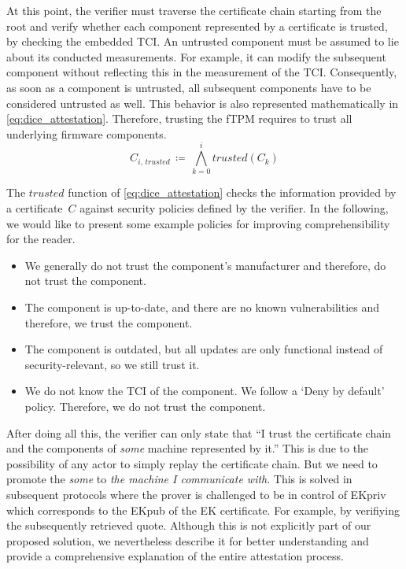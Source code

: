 At this point, the verifier must traverse the certificate chain starting from the root and verify whether each component represented by a certificate is trusted, by checking the embedded TCI\@.
An untrusted component must be assumed to lie about its conducted measurements.
For example, it can modify the subsequent component without reflecting this in the measurement of the TCI\@.
Consequently, as soon as a component is untrusted, all subsequent components have to be considered untrusted as well.
This behavior is also represented mathematically in \autoref{eq:dice_attestation}.
Therefore, trusting the fTPM requires to trust all underlying firmware components.
\begin{equation}
    \label{eq:dice_attestation}
    C_{i, \, trusted} \, \coloneqq \, \bigwedge_{k=0}^{i} trusted(C_{k})
\end{equation}


The \(trusted\) function of \autoref{eq:dice_attestation} checks the information provided by a certificate~\(C\) against security policies defined by the verifier.
In the following, we would like to present some example policies for improving comprehensibility for the reader.

\begin{itemize}
    \item We generally do not trust the component's manufacturer and therefore, do not trust the component.
    \item The component is up-to-date, and there are no known vulnerabilities and therefore, we trust the component.
    \item The component is outdated, but all updates are only functional instead of security-relevant, so we still trust it.
    \item We do not know the TCI of the component. We follow a `Deny by default' policy. Therefore, we do not trust the component.
\end{itemize}

After doing all this, the verifier can only state that ``I trust the certificate chain and the components of \emph{some} machine represented by it.''
This is due to the possibility of any actor to simply replay the certificate chain.
But we need to promote the \emph{some} to \emph{the machine I communicate with}.
This is solved in subsequent protocols where the prover is challenged to be in control of EKpriv which corresponds to the EKpub of the EK certificate.
For example, by verifiying the subsequently retrieved quote.
Although this is not explicitly part of our proposed solution, we nevertheless describe it for better understanding and provide a comprehensive explanation of the entire attestation process.

